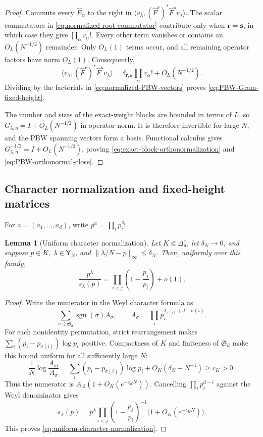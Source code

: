 \documentclass[11pt]{article}
\newtheorem{lemma}[lemma]{Lemma}
\theoremstyle{remark}
\theoremstyle{plain}
\begin{document}
\begin{proof}
Commute every \(\widehat E_\alpha\) to the right in
\(\langle v_\lambda,(\widehat F^{\mathbf r})^*
\widehat F^{\mathbf s}v_\lambda\rangle\).  The scalar commutators in
\eqref{eq:normalized-root-commutator} contribute only when
\(\mathbf r=\mathbf s\), in which case they give
\(\prod_\alpha r_\alpha!\).  Every other term vanishes or contains an
\(O_L(N^{-1/2})\) remainder.  Only \(O_L(1)\) terms occur, and all remaining
operator factors have norm \(O_L(1)\). Consequently,
\[
  \langle v_\lambda,(\widehat F^{\mathbf r})^*
  \widehat F^{\mathbf s}v_\lambda\rangle
  =\delta_{\mathbf r,\mathbf s}\prod_\alpha r_\alpha!
   +O_L(N^{-1/2}).
\]
Dividing by the factorials in \eqref{eq:normalized-PBW-vectors} proves
\eqref{eq:PBW-Gram-fixed-height}.

The number and sizes of the exact-weight blocks are bounded in terms of \(L\), so
\(G_{\lambda,\eta}=I+O_L(N^{-1/2})\) in operator norm.  It is therefore
invertible for large \(N\), and the PBW spanning vectors form a basis.
Functional calculus gives
\(G_{\lambda,\eta}^{-1/2}=I+O_L(N^{-1/2})\), proving
\eqref{eq:exact-block-orthonormalization} and
\eqref{eq:PBW-orthonormal-close}.
\end{proof}

\subsection{Character normalization and fixed-height matrices}

For \(a=(a_1,\ldots,a_d)\), write \(p^a=\prod_i p_i^{a_i}\).

\begin{lemma}[Uniform character normalization]
\label{lem:uniform-character-normalization}
Let \(K\Subset\Delta_d^\circ\), let \(\delta_N\to0\), and suppose
\(p\in K\), \(\lambda\in\mathsf Y_N\), and
\(\|\lambda/N-p\|_\infty\le\delta_N\).  Then, uniformly over this family,
\begin{equation}\label{eq:uniform-character-normalization}
  \frac{p^\lambda}{s_\lambda(p)}
  =\prod_{i<j}\left(1-\frac{p_j}{p_i}\right)+o(1).
\end{equation}
\end{lemma}

\begin{proof}
Write the numerator in the Weyl character formula as
\[
  \sum_{\sigma\in\mathfrak S_d}\operatorname{sgn}(\sigma)A_\sigma,
  \qquad
  A_\sigma=\prod_i p_i^{\lambda_{\sigma(i)}+d-\sigma(i)}.
\]
For each nonidentity permutation, strict rearrangement
makes \(\sum_i(p_i-p_{\sigma(i)})\log p_i\) positive.  Compactness of
\(K\) and finiteness of \(\mathfrak S_d\) make this bound uniform for all
sufficiently large \(N\):
\[
  \frac1N\log\frac{A_{\mathrm{id}}}{A_\sigma}
  =\sum_i(p_i-p_{\sigma(i)})\log p_i
   +O_K(\delta_N+N^{-1})\ge c_K>0.
\]
Thus the numerator is \(A_{\mathrm{id}}(1+O_K(e^{-c_KN}))\).
Cancelling \(\prod_i p_i^{d-i}\) against the Weyl denominator gives
\[
  s_\lambda(p)
  =p^\lambda
   \prod_{i<j}\left(1-\frac{p_j}{p_i}\right)^{-1}
   \bigl(1+O_K(e^{-c_KN})\bigr).
\]
This proves \eqref{eq:uniform-character-normalization}.
\end{proof}
\end{document}
